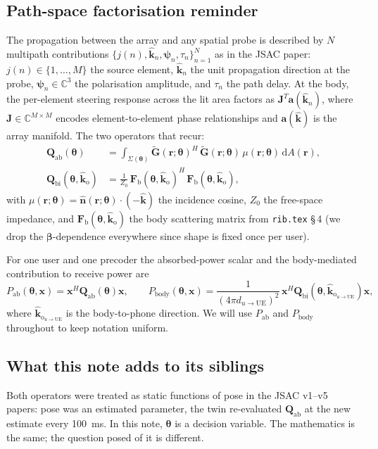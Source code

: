 \documentclass[11pt,a4paper]{article}
\theoremstyle{definition}
\newcommand{\khat}{\hat{\bm{k}}}
\newcommand{\nhat}{\hat{\bm{n}}}
\newcommand{\rr}{\mathbf{r}}
\newcommand{\diff}{\mathrm{d}}
\newcommand{\Complex}{\mathbb{C}}
\newcommand{\Gtil}{\tilde{\mathbf{G}}}
\newcommand{\Qabs}{\mathbf{Q}_{\mathrm{ab}}}
\newcommand{\kout}{\hat{\bm{k}}_{\mathrm{o}}}
\newcommand{\Frib}{\mathbf{F}_{\mathrm{b}}}
\newcommand{\Qbist}{\mathbf{Q}_{\mathrm{bi}}}
\newcommand{\Jmat}{\mathbf{J}}
\newcommand{\xvec}{\mathbf{x}}
\newcommand{\thetab}{\bm{\theta}}
\newcommand{\betab}{\bm{\beta}}
\newcommand{\Pabs}{P_{\mathrm{ab}}}
\newcommand{\Pbody}{P_{\mathrm{body}}}
\begin{document}
\subsection{Path-space factorisation reminder}

The propagation between the array and any spatial probe is
described by $N$ multipath contributions
$\{j(n),\khat_n,\bm\psi_n,\tau_n\}_{n=1}^N$ as in the JSAC paper:
$j(n)\in\{1,\dots,M\}$ the source element, $\khat_n$ the unit
propagation direction at the probe, $\bm\psi_n\in\Complex^3$ the
polarisation amplitude, and $\tau_n$ the path delay.  At the body,
the per-element steering response across the lit area factors as
$\Jmat^T\mathbf{a}(\khat_n)$, where $\Jmat\in\Complex^{M\times M}$
encodes element-to-element phase relationships and
$\mathbf{a}(\khat)$ is the array manifold.  The two operators that
recur:
\begin{align}
  \Qabs(\thetab)
  &= \int_{\Sigma(\thetab)}
     \Gtil(\rr;\thetab)^H\,\Gtil(\rr;\thetab)\,
     \mu(\rr;\thetab)\,\diff A(\rr),
  \label{eq:Qabs-def}\\[0.2em]
  \Qbist(\thetab,\kout)
  &= \frac{1}{Z_0}\,\Frib(\thetab,\kout)^H\,
     \Frib(\thetab,\kout),
  \label{eq:Qbist-def}
\end{align}
with $\mu(\rr;\thetab)=\nhat(\rr;\thetab)\cdot(-\khat)$ the
incidence cosine, $Z_0$ the free-space impedance, and
$\Frib(\thetab,\kout)$ the body scattering matrix from
\texttt{rib.tex} \S\,4 (we drop the $\betab$-dependence everywhere
since shape is fixed once per user).

For one user and one precoder the absorbed-power scalar and the
body-mediated contribution to receive power are
\begin{equation}\label{eq:Pabs-Pbody}
  \Pabs(\thetab,\xvec)=\xvec^H\Qabs(\thetab)\xvec,
  \qquad
  \Pbody(\thetab,\xvec)
   =\frac{1}{(4\pi d_{u\to\mathrm{UE}})^2}\,
    \xvec^H\Qbist(\thetab,\kout_{u\to\mathrm{UE}})\xvec,
\end{equation}
where $\kout_{u\to\mathrm{UE}}$ is the body-to-phone direction.  We
will use $\Pabs$ and $\Pbody$ throughout to keep notation uniform.

\subsection{What this note adds to its siblings}

Both operators were treated as static functions of pose in the JSAC
v1--v5 papers: pose was an estimated parameter, the twin
re-evaluated $\Qabs$ at the new estimate every \SI{100}{ms}.  In
this note, $\thetab$ is a decision variable.  The mathematics is
the same; the question posed of it is different.
\end{document}
